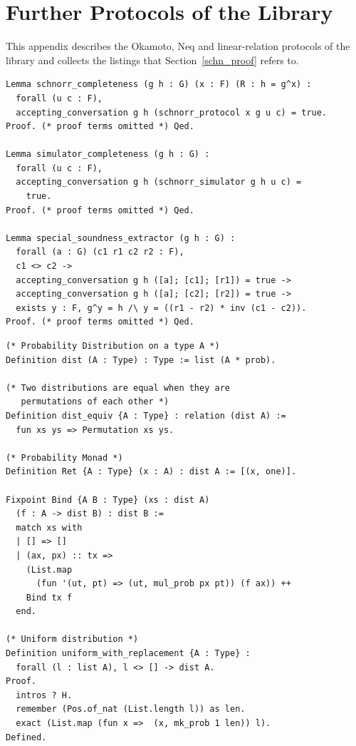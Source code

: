 \section{Further Protocols of the Library}\label{app:eqneq}
This appendix describes the Okamoto, Neq and linear-relation protocols of
the library and collects the listings that Section~\ref{schn_proof}
refers to.

\begin{lstlisting}[frame=single, language=Coq, caption={Completeness and Soundness},
  label={comp_sound},captionpos=t, basicstyle=\ttfamily\scriptsize,
  abovecaptionskip=-\medskipamount]
Lemma schnorr_completeness (g h : G) (x : F) (R : h = g^x) :
  forall (u c : F),
  accepting_conversation g h (schnorr_protocol x g u c) = true.
Proof. (* proof terms omitted *) Qed.

Lemma simulator_completeness (g h : G) :
  forall (u c : F),
  accepting_conversation g h (schnorr_simulator g h u c) =
    true.
Proof. (* proof terms omitted *) Qed.

Lemma special_soundness_extractor (g h : G) :
  forall (a : G) (c1 r1 c2 r2 : F),
  c1 <> c2 ->
  accepting_conversation g h ([a]; [c1]; [r1]) = true ->
  accepting_conversation g h ([a]; [c2]; [r2]) = true ->
  exists y : F, g^y = h /\ y = ((r1 - r2) * inv (c1 - c2)).
Proof. (* proof terms omitted *) Qed.
\end{lstlisting}

\begin{lstlisting}[frame=single, language=Coq, caption={Uniform Probability Distribution},
    label={prob_def},captionpos=t, basicstyle=\ttfamily\scriptsize,
    abovecaptionskip=-\medskipamount]
(* Probability Distribution on a type A *)
Definition dist (A : Type) : Type := list (A * prob).

(* Two distributions are equal when they are
   permutations of each other *)
Definition dist_equiv {A : Type} : relation (dist A) :=
  fun xs ys => Permutation xs ys.

(* Probability Monad *)
Definition Ret {A : Type} (x : A) : dist A := [(x, one)].

Fixpoint Bind {A B : Type} (xs : dist A)
  (f : A -> dist B) : dist B :=
  match xs with
  | [] => []
  | (ax, px) :: tx =>
    (List.map
      (fun '(ut, pt) => (ut, mul_prob px pt)) (f ax)) ++
    Bind tx f
  end.

(* Uniform distribution *)
Definition uniform_with_replacement {A : Type} :
  forall (l : list A), l <> [] -> dist A.
Proof.
  intros ? H.
  remember (Pos.of_nat (List.length l)) as len.
  exact (List.map (fun x =>  (x, mk_prob 1 len)) l).
Defined.
\end{lstlisting}

